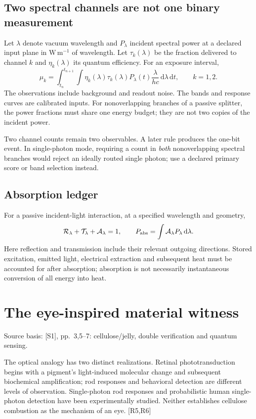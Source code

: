 \documentclass[10pt,a4paper]{article}
\numberwithin{equation}{section}
\newcommand{\src}[1]{\textcolor{muted}{\footnotesize Source basis: #1.}}
\newcommand{\newpart}{\clearpage}
\newcommand{\dd}{\,\mathrm{d}}
\begin{document}
\subsection*{Two spectral channels are not one binary measurement}
Let $\lambda$ denote vacuum wavelength and $P_\lambda$ incident spectral power at a declared input plane in $\mathrm{W\,m^{-1}}$ of wavelength. Let $\tau_k(\lambda)$ be the fraction delivered to channel $k$ and $\eta_k(\lambda)$ its quantum efficiency. For an exposure interval,
\begin{equation}
\mu_k=\int_{t_n}^{t_{n+1}}\int
\eta_k(\lambda)\tau_k(\lambda)P_\lambda(t)
\frac{\lambda}{hc}\dd\lambda\dd t,\qquad k=1,2.
\end{equation}
The observations include background and readout noise. The bands and response curves are calibrated inputs. For nonoverlapping branches of a passive splitter, the power fractions must share one energy budget; they are not two copies of the incident power.

Two channel counts remain two observables. A later rule produces the one-bit event. In single-photon mode, requiring a count in \emph{both} nonoverlapping spectral branches would reject an ideally routed single photon; use a declared primary score or band selection instead.

\subsection*{Absorption ledger}
For a passive incident-light interaction, at a specified wavelength and geometry,
\begin{equation}
\mathcal R_\lambda+\mathcal T_\lambda+\mathcal A_\lambda=1,
\qquad P_{\rm abs}=\int\mathcal A_\lambda P_\lambda\dd\lambda .
\end{equation}
Here reflection and transmission include their relevant outgoing directions. Stored excitation, emitted light, electrical extraction and subsequent heat must be accounted for after absorption; absorption is not necessarily instantaneous conversion of all energy into heat.

\newpart
\section{The eye-inspired material witness}
\label{sec:witness}
\src{[S1], pp.~3,5--7: cellulose/jelly, double verification and quantum sensing}

The optical analogy has two distinct realizations. Retinal phototransduction begins with a pigment's light-induced molecular change and subsequent biochemical amplification; rod responses and behavioral detection are different levels of observation. Single-photon rod responses and probabilistic human single-photon detection have been experimentally studied. Neither establishes cellulose combustion as the mechanism of an eye. [R5,R6]
\end{document}
